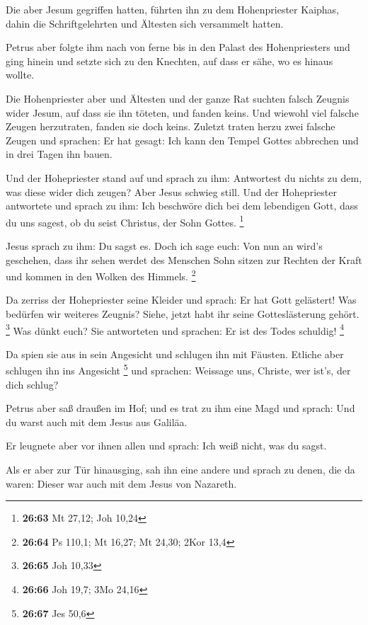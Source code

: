  Die aber Jesum gegriffen hatten, führten ihn zu dem
Hohenpriester Kaiphas, dahin die Schriftgelehrten und Ältesten sich
versammelt hatten.

 Petrus aber folgte ihm nach von ferne bis in den Palast
des Hohenpriesters und ging hinein und setzte sich zu den Knechten, auf
dass er sähe, wo es hinaus wollte.

 Die Hohenpriester aber und Ältesten und der ganze Rat
suchten falsch Zeugnis wider Jesum, auf dass sie ihn töteten,
 und fanden keins. Und wiewohl viel falsche Zeugen
herzutraten, fanden sie doch keins. Zuletzt traten herzu zwei falsche
Zeugen  und sprachen: Er hat gesagt: Ich kann den Tempel
Gottes abbrechen und in drei Tagen ihn bauen.

 Und der Hohepriester stand auf und sprach zu ihm:
Antwortest du nichts zu dem, was diese wider dich zeugen? 
Aber Jesus schwieg still. Und der Hohepriester antwortete und sprach zu
ihm: Ich beschwöre dich bei dem lebendigen Gott, dass du uns sagest, ob
du seist Christus, der Sohn Gottes. \footnote{\textbf{26:63} Mt 27,12;
  Joh 10,24}

 Jesus sprach zu ihm: Du sagst es. Doch ich sage euch: Von
nun an wird's geschehen, dass ihr sehen werdet des Menschen Sohn sitzen
zur Rechten der Kraft und kommen in den Wolken des Himmels. \footnote{\textbf{26:64}
  Ps 110,1; Mt 16,27; Mt 24,30; 2Kor 13,4}

 Da zerriss der Hohepriester seine Kleider und sprach: Er
hat Gott gelästert! Was bedürfen wir weiteres Zeugnis? Siehe, jetzt habt
ihr seine Gotteslästerung gehört. \footnote{\textbf{26:65} Joh 10,33}
 Was dünkt euch? Sie antworteten und sprachen: Er ist des
Todes schuldig! \footnote{\textbf{26:66} Joh 19,7; 3Mo 24,16}

 Da spien sie aus in sein Angesicht und schlugen ihn mit
Fäusten. Etliche aber schlugen ihn ins Angesicht \footnote{\textbf{26:67}
  Jes 50,6}  und sprachen: Weissage uns, Christe, wer
ist's, der dich schlug?

 Petrus aber saß draußen im Hof; und es trat zu ihm eine
Magd und sprach: Und du warst auch mit dem Jesus aus Galiläa.

 Er leugnete aber vor ihnen allen und sprach: Ich weiß
nicht, was du sagst.

 Als er aber zur Tür hinausging, sah ihn eine andere und
sprach zu denen, die da waren: Dieser war auch mit dem Jesus von
Nazareth.

